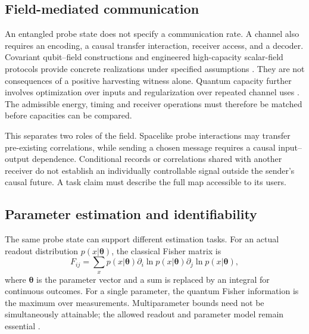 \documentclass[pdflatex,sn-mathphys-num]{sn-jnl}
\begin{document}
\subsection{Field-mediated communication}
\label{sec:communication}
An entangled probe state does not specify a communication rate. A channel also requires an encoding, a causal transfer interaction, receiver access, and a decoder. Covariant qubit--field constructions and engineered high-capacity scalar-field protocols provide concrete realizations under specified assumptions \cite{Kasprzak2025,Simidzija2020}. They are not consequences of a positive harvesting witness alone. Quantum capacity further involves optimization over inputs and regularization over repeated channel uses \cite{Lloyd1997,Devetak2005}. The admissible energy, timing and receiver operations must therefore be matched before capacities can be compared.

This separates two roles of the field. Spacelike probe interactions may transfer pre-existing correlations, while sending a chosen message requires a causal input--output dependence. Conditional records or correlations shared with another receiver do not establish an individually controllable signal outside the sender's causal future. A task claim must describe the full map accessible to its users.

\subsection{Parameter estimation and identifiability}
\label{sec:metrology}
The same probe state can support different estimation tasks. For an actual readout distribution $p(x|\boldsymbol\theta)$, the classical Fisher matrix is
\begin{equation}
F_{ij}=\sum_x p(x|\boldsymbol\theta)
\partial_i\ln p(x|\boldsymbol\theta)
\partial_j\ln p(x|\boldsymbol\theta),
\label{eq:classical-fi}
\end{equation}
where $\boldsymbol\theta$ is the parameter vector and a sum is replaced by an integral for continuous outcomes. For a single parameter, the quantum Fisher information is the maximum over measurements. Multiparameter bounds need not be simultaneously attainable; the allowed readout and parameter model remain essential \cite{BraunsteinCaves1994,Paris2009}.
\end{document}
